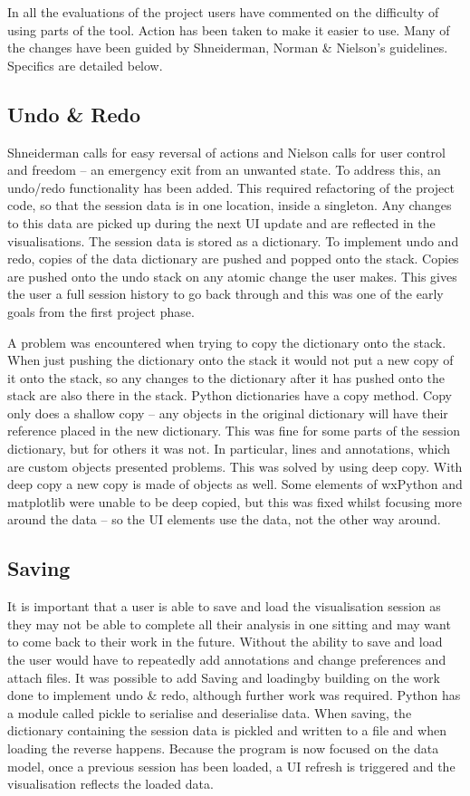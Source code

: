 In all the evaluations of the project users have commented on the difficulty of using parts of the tool.  Action has been taken to make it easier to use.  Many of the changes have been guided by Shneiderman, Norman \& Nielson's guidelines.  Specifics are detailed below.

\subsection{Undo \& Redo}
Shneiderman calls for easy reversal of actions and Nielson calls for user control and freedom -- an emergency exit from an unwanted state.  To address this, an undo/redo functionality has been added.  This required refactoring of the project code, so that the session data is in one location, inside a singleton. Any changes to this data are picked up during the next \ac{UI} update and are reflected in the visualisations.  The session data is stored as a dictionary.  To implement undo and redo, copies of the data dictionary are pushed and popped onto the stack.  Copies are pushed onto the undo stack on any atomic change the user makes.  This gives the user a full session history to go back through and this was one of the early goals from the first project phase.

A problem was encountered when trying to copy the dictionary onto the stack.  When just pushing the dictionary onto the stack it would not put a new copy of it onto the stack, so any changes to the dictionary after it has pushed onto the stack are also there in the stack.  Python dictionaries have a copy method.  Copy only does a shallow copy -- any objects in the original dictionary will have their reference placed in the new dictionary.  This was fine for some parts of the session dictionary, but for others it was not. In particular, lines and annotations, which are custom objects presented problems.  This was solved by using deep copy.  With deep copy a new copy is made of objects as well.  Some elements of wxPython and matplotlib were unable to be deep copied, but this was fixed whilst focusing more around the data -- so the \ac{UI} elements use the data, not the other way around.

\subsection{Saving}

It is important that a user is able to save and load the visualisation session as they may not be able to complete all their analysis in one sitting and may want to come back to their work in the future.  Without the ability to save and load the user would have to repeatedly add annotations and change preferences and attach files.  It was possible to add Saving and loadingby building on the work done to implement undo \& redo, although further work was required. Python has a module called pickle to serialise and deserialise data.  When saving, the dictionary containing the session data is pickled and written to a file and when loading the reverse happens.  Because the program is now focused on the data model, once a previous session has been loaded, a \ac{UI} refresh is triggered and the visualisation reflects the loaded data.

